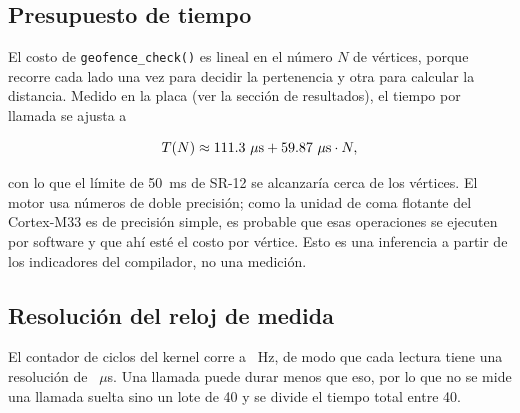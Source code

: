 \subsection{Presupuesto de tiempo}

El costo de \texttt{geofence\_check()} es lineal en el número $N$ de vértices, porque recorre cada
lado una vez para decidir la pertenencia y otra para calcular la distancia. Medido en la placa
(ver la sección de resultados), el tiempo por llamada se ajusta a

\begin{equation}
T(N) \approx 111.3~\mu\text{s} + 59.87~\mu\text{s}\cdot N,
\end{equation}

con lo que el límite de 50~ms de SR-12 se alcanzaría cerca de los \dBenchLimitVertices{} vértices.
El motor usa números de doble precisión; como la unidad de coma flotante del Cortex-M33 es de
precisión simple, es probable que esas operaciones se ejecuten por software y que ahí esté el
costo por vértice. Esto es una inferencia a partir de los indicadores del compilador, no una
medición.

\subsection{Resolución del reloj de medida}

El contador de ciclos del kernel corre a \dClockHz~Hz, de modo que cada lectura tiene una
resolución de \dTickUs~$\mu$s. Una llamada puede durar menos que eso, por lo que no se mide una
llamada suelta sino un lote de 40 y se divide el tiempo total entre 40.
